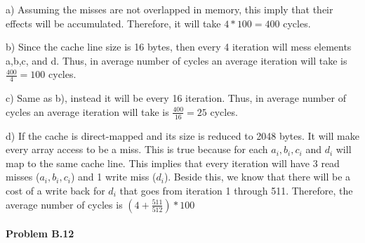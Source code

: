 \documentclass[11pt]{article}
\begin{document}

\begin{flushleft}
    a) Assuming the misses are not overlapped in memory, this imply that their effects will be accumulated. Therefore, it will take $4*100 = 400$ cycles.
    \newline

    b) Since the cache line size is 16 bytes, then every 4 iteration will mess elements a,b,c, and d.
    Thus, in average number of cycles an average iteration will take is $\frac{400}{4} = 100$ cycles.
    \newline
    
    c) Same as b), instead it will be every 16 iteration. Thus, in average number of cycles an average iteration will take is $\frac{400}{16} = 25$ cycles.
    \newline

    d) If the cache is direct-mapped and its size is reduced to 2048 bytes. It will make every array access to be a miss. This is true because for each $a_i , b_i, c_i$ and $d_i$ will map to the same cache line.
    This implies that every iteration will have 3 read misses ($a_i, b_i, c_i$) and 1 write miss ($d_i$). Beside this, we know that there will be a cost of a write back for $d_i$ that 
    goes from iteration 1 through 511.
    \newline
    Therefore, the average number of cycles is $(4 + \frac{511}{512} )* 100$
\end{flushleft}   

\paragraph{\noindent\textbf{\LARGE{Problem B.12}}}

\end{document}

